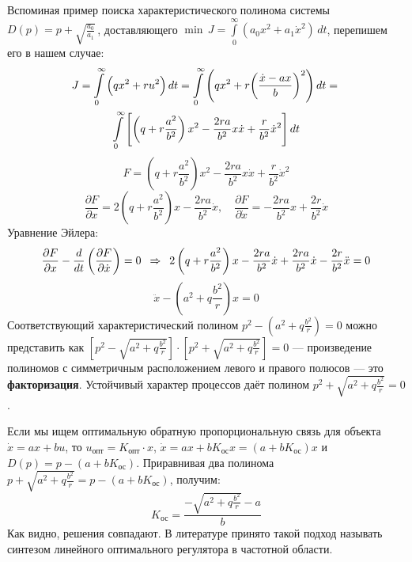 \documentclass[preprint,russian,a5paper,10pt,twoside,mediummath]{ncc}
\begin{document}
Вспоминая пример поиска характеристического полинома системы $D\left( p \right)=p+\sqrt{\frac{{{a}_{0}}}{{{a}_{1}}}}\,$, доставляющего $\min \, J=\int\limits_{0}^{\infty }{\left( a_0{{x}^{2}}+a_1{{{\dot{x}}}^{2}} \right)} \, dt$, перепишем его в нашем случае:
\begin{multline*}
J = \int\limits_{0}^{\infty }{\Bigl( q{{x}^{2}}+r{{u}^{2}} \Bigr)} \, dt = \int\limits_{0}^{\infty }{\left( q{{x}^{2}}+r{{\left( \frac{\dot{x}-ax}{b} \right)}^{2}} \right)} \, dt ={} \\*
	\int\limits_{0}^{\infty }{ \Biggl[ \left( q+r\frac{{{a}^{2}}}{{{b}^{2}}} \right){{x}^{2}}-\frac{2ra}{{{b}^{2}}}x\dot{x}+\frac{r}{{{b}^{2}}}{{{\dot{x}}}^{2}} \Biggr] } \, dt
\end{multline*}
\[ F=\left( q+r\frac{{{a}^{2}}}{{{b}^{2}}} \right){{x}^{2}}-\frac{2ra}{{{b}^{2}}}x\dot{x}+\frac{r}{{{b}^{2}}}{{\dot{x}}^{2}} \]
\[ \frac{\partial F}{\partial x}=2\left( q+r\frac{{{a}^{2}}}{{{b}^{2}}} \right)x-\frac{2ra}{{{b}^{2}}}\dot{x}, \quad
	\frac{\partial F}{\partial \dot{x}}=-\frac{2ra}{{{b}^{2}}}x+\frac{2r}{{{b}^{2}}}\dot{x} \]
Уравнение Эйлера:
\[ \frac{\partial F}{\partial x}-\frac{d}{dt}\left( \frac{\partial F}{\partial \dot{x}} \right)=0 \enskip \Rightarrow \enskip 2\left( q + r \frac{a^2}{b^2} \right) x - \frac{2ra}{b^2} \dot{x} + \frac{2ra}{b^2} \dot{x} - \frac{2r}{b^2} \ddot{x} = 0 \]
\[ \ddot{x} - \left( a^2 + q \frac{b^2}{r} \right) x = 0 \]
Соответствующий характеристический полином \vspace{1ex} ${{p}^{2}}-\left( {{a}^{2}}+q\frac{{{b}^{2}}}{r} \right)=0$ можно представить как $\left[ p^2 - \sqrt{a^2 + q \frac{b^2}{r}} \right] \cdot \left[ p^2 + \sqrt{a^2 + q \frac{b^2}{r}} \right] = 0 $ \vspace{1ex} --- произведение полиномов с симметричным расположением левого и правого полюсов --- это \textbf{факторизация}. Устойчивый характер процессов даёт полином $ p^2 + \sqrt{a^2 + q \frac{b^2}{r}} = 0 $.

Если мы ищем оптимальную обратную пропорциональную связь для объекта $\dot{x}=ax+bu$, то $ u_\textit{опт} = K_\textit{опт} \cdot x $, $\dot{x}=ax+b{{K}_\textit{ос}}x=\left( a+b{{K}_\textit{ос}} \right)x$ и $D\left( p \right)=p-\left( a+b{{K}_\textit{ос}} \right)$. Приравнивая два полинома $p+\sqrt{{{a}^{2}}+q\frac{{{b}^{2}}}{r}}=p-\left( a+b{{K}_\textit{ос}} \right)$, получим:
\[ K_\textit{ос} = \frac{-\sqrt{{{a}^{2}}+q\frac{{{b}^{2}}}{r}}-a}{b} \]
Как видно, решения совпадают. В литературе принято такой подход называть синтезом линейного оптимального регулятора в частотной области.
\end{document}
